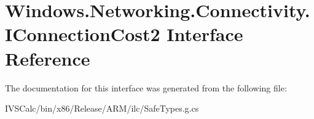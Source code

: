 \hypertarget{interface_windows_1_1_networking_1_1_connectivity_1_1_i_connection_cost2}{}\section{Windows.\+Networking.\+Connectivity.\+I\+Connection\+Cost2 Interface Reference}
\label{interface_windows_1_1_networking_1_1_connectivity_1_1_i_connection_cost2}


The documentation for this interface was generated from the following file\+:\begin{DoxyCompactItemize}
\item 
I\+V\+S\+Calc/bin/x86/\+Release/\+A\+R\+M/ilc/Safe\+Types.\+g.\+cs\end{DoxyCompactItemize}
